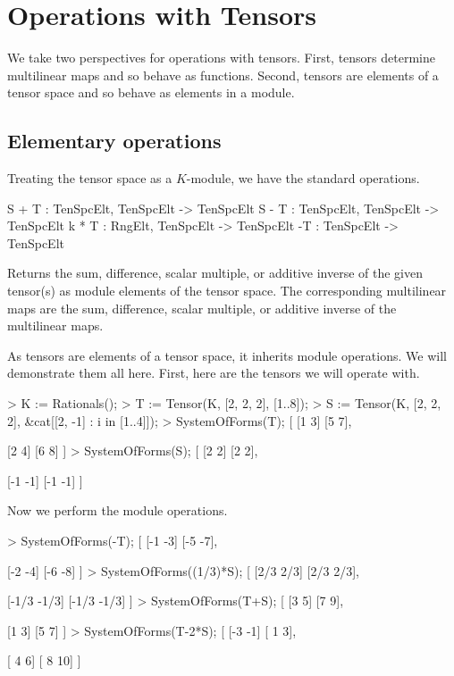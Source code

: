 \section{Operations with Tensors}

We take two perspectives for operations with tensors. 
First, tensors determine multilinear maps and so behave as
functions.  Second, tensors are elements of a tensor space and 
so behave as elements in a module.  

\subsection{Elementary operations}
Treating the tensor space as a $K$-module, we have the standard operations.

\index{$+$}
\begin{intrinsics}
S + T : TenSpcElt, TenSpcElt -> TenSpcElt
S - T : TenSpcElt, TenSpcElt -> TenSpcElt
k * T : RngElt, TenSpcElt -> TenSpcElt
-T : TenSpcElt -> TenSpcElt
\end{intrinsics}

Returns the sum, difference, scalar multiple, or additive inverse of the given tensor(s) as module elements of the tensor space. 
The corresponding multilinear maps are the sum, difference, scalar multiple, or additive inverse of the multilinear maps.

\begin{example}[ModuleOperations]

As tensors are elements of a tensor space, it inherits module operations. 
We will demonstrate them all here.
First, here are the tensors we will operate with.
\begin{code}
> K := Rationals();
> T := Tensor(K, [2, 2, 2], [1..8]);
> S := Tensor(K, [2, 2, 2], &cat[[2, -1] : i in [1..4]]);
> SystemOfForms(T);
[
    [1 3]
    [5 7],

    [2 4]
    [6 8]
]
> SystemOfForms(S);
[
    [2 2]
    [2 2],

    [-1 -1]
    [-1 -1]
]
\end{code}

Now we perform the module operations.
\begin{code}
> SystemOfForms(-T);
[
    [-1 -3]
    [-5 -7],

    [-2 -4]
    [-6 -8]
]
> SystemOfForms((1/3)*S);
[
    [2/3 2/3]
    [2/3 2/3],

    [-1/3 -1/3]
    [-1/3 -1/3]
]
> SystemOfForms(T+S);
[
    [3 5]
    [7 9],

    [1 3]
    [5 7]
]
> SystemOfForms(T-2*S);
[
    [-3 -1]
    [ 1  3],

    [ 4  6]
    [ 8 10]
]
\end{code}
\end{example}

